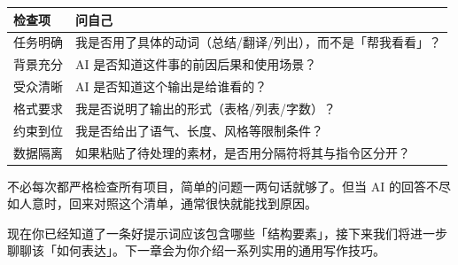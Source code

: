 \begin{center}
\begin{tabular}{lp{9cm}}
  \toprule
  \textbf{检查项} & \textbf{问自己} \\
  \midrule
  任务明确 & 我是否用了具体的动词（总结/翻译/列出），而不是「帮我看看」？ \\
  背景充分 & AI 是否知道这件事的前因后果和使用场景？ \\
  受众清晰 & AI 是否知道这个输出是给谁看的？ \\
  格式要求 & 我是否说明了输出的形式（表格/列表/字数）？ \\
  约束到位 & 我是否给出了语气、长度、风格等限制条件？ \\
  数据隔离 & 如果粘贴了待处理的素材，是否用分隔符将其与指令区分开？ \\
  \bottomrule
\end{tabular}
\end{center}

不必每次都严格检查所有项目，简单的问题一两句话就够了。但当 AI 的回答不尽如人意时，回来对照这个清单，通常很快就能找到原因。

现在你已经知道了一条好提示词应该包含哪些「结构要素」，接下来我们将进一步聊聊该「如何表达」。下一章会为你介绍一系列实用的通用写作技巧。
